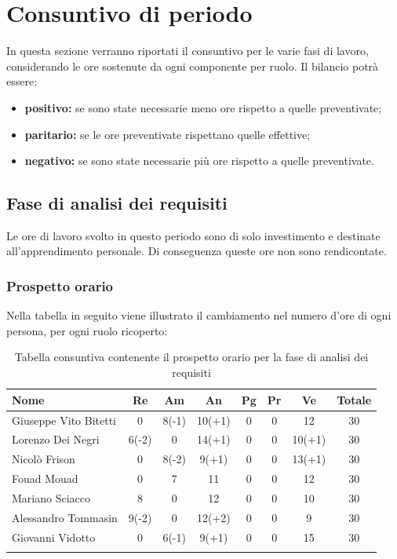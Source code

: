 \section{Consuntivo di periodo}
		In questa sezione verranno riportati il consuntivo per le varie fasi di lavoro, considerando le ore sostenute da ogni componente per ruolo. Il bilancio potrà essere:
		\begin{itemize}
			\item \textbf{positivo:} se sono state necessarie meno ore rispetto a quelle preventivate;	 
			\item \textbf{paritario:} se le ore preventivate rispettano quelle effettive;	 
			\item \textbf{negativo:} se sono state necessarie più ore rispetto a quelle preventivate.
		\end{itemize}
	\subsection{Fase di analisi dei requisiti}
		Le ore di lavoro svolto in questo periodo sono di solo investimento e destinate all'apprendimento personale. Di conseguenza queste ore non sono rendicontate. 
		\subsubsection{Prospetto orario}
			Nella tabella in seguito viene illustrato il cambiamento nel numero d'ore di ogni persona, per ogni ruolo ricoperto:
			
			\begin{longtable}{|l|c|c|c|c|c|c|c|}
				\hline
				\rowcolor{lighter-grayer}
				\textbf{Nome} & \textbf{Re} & \textbf{Am} & \textbf{An} & \textbf{Pg}  & \textbf{Pr}   & \textbf{Ve} & \textbf{Totale} \\
				\hline
				\endfirsthead
				
				\hline
				Giuseppe Vito Bitetti 		& 0 & 8(-1) & 10(+1) & 0 & 0 & 12 & 30\\
				\hline
				\hline
				Lorenzo Dei Negri			 & 6(-2) & 0 & 14(+1) & 0 & 0 & 10(+1) & 30\\
				\hline
				\hline
				Nicolò Frison 					& 0 & 8(-2) & 9(+1) & 0 & 0 & 13(+1) & 30\\
				\hline
				\hline
				Fouad Mouad 				& 0 & 7 & 11 & 0 & 0 & 12 & 30\\
				\hline
				\hline
				Mariano Sciacco 			& 8 & 0 & 12 & 0 & 0 & 10 & 30\\
				\hline
				\hline
				Alessandro Tommasin    & 9(-2) & 0 & 12(+2) & 0 & 0 & 9 & 30\\
				\hline
				\hline
				Giovanni Vidotto 			& 0 & 6(-1) & 9(+1) & 0 & 0 & 15 & 30\\
				\hline 
				\caption{Tabella consuntiva contenente il prospetto orario per la fase di analisi dei requisiti}
			\end{longtable}
			\pagebreak	
			
